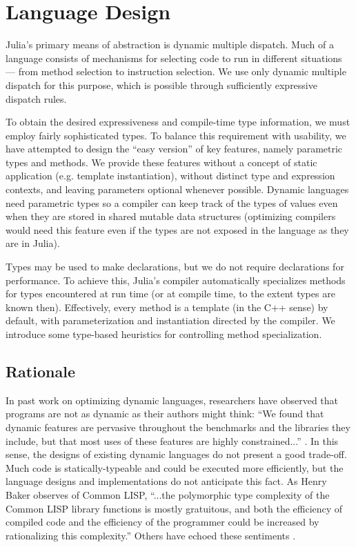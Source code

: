 \documentclass[9pt]{sigplanconf}
\begin{document}
\section{Language Design}

Julia's primary means of abstraction is dynamic multiple dispatch.
Much of a language consists of mechanisms for selecting
code to run in different situations --- from method selection to
instruction selection. We use only dynamic multiple dispatch for this
purpose, which is possible through sufficiently expressive
dispatch rules.

To obtain the desired expressiveness and compile-time type information,
we must employ fairly sophisticated types. To balance this
requirement with usability, we have attempted to design the
``easy version'' of key features, namely parametric types and methods.
We provide these features without a concept of static application
(e.g. template instantiation), without distinct type and expression
contexts, and leaving parameters optional whenever possible.
Dynamic languages need parametric types so a compiler can keep track
of the types of values even when they are stored in shared mutable data
structures (optimizing compilers would need this feature even if the
types are not exposed in the language as they are in Julia).


Types may be used to make declarations, but we do not
require declarations for performance. To achieve this, Julia's compiler
automatically specializes methods for types encountered at run time
(or at compile time, to the extent types are known then). Effectively,
every method is a template (in the C++ sense) by default, with
parameterization and instantiation directed by the compiler.
We introduce some type-based heuristics for controlling method specialization.

\subsection{Rationale}

In past work on optimizing dynamic languages, researchers have observed that
programs are not as dynamic as their authors might think:
``We found that dynamic
features are pervasive throughout the benchmarks and the libraries they
include, but that most uses of these features are highly constrained...''
\cite{profileguided}. In this sense, the designs of existing dynamic languages
do not present a good trade-off. Much code is statically-typeable and could be
executed more efficiently, but the language designs and implementations do not
anticipate this fact. As Henry Baker observes of Common LISP, ``...the
polymorphic type complexity of the Common LISP library functions is mostly
gratuitous, and both the efficiency of compiled code and the efficiency of the
programmer could be increased by rationalizing this complexity.''\cite{nimble}
Others have echoed these sentiments \cite{lispcrit}.
\end{document}

